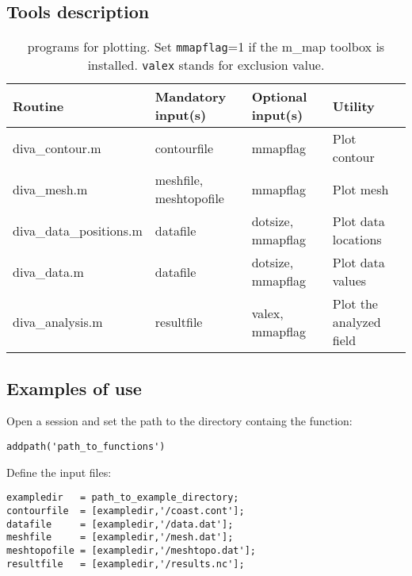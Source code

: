 \subsection{Tools description}
 
\begin{table}[htpb]
\centering
\caption[\matlab programs for plotting.]{\matlab programs for plotting. Set \texttt{mmapflag}=1 if the m\_map toolbox is installed. \texttt{valex} stands for exclusion value.}
\begin{tabular*}{\textwidth}{@{\extracolsep{\fill}}llll}
\toprule
Routine				&	Mandatory input(s) 		&	Optional input(s)	& 	Utility  			\\
\midrule
diva\_contour.m 		&	contourfile 			& mmapflag 			&	Plot contour		\\
diva\_mesh.m 			& meshfile, meshtopofile 	& mmapflag 			&	Plot mesh			\\
diva\_data\_positions.m	& datafile 					& dotsize, mmapflag & 	Plot data locations	\\
diva\_data.m 			& datafile 					& dotsize, mmapflag & Plot data values		\\
diva\_analysis.m 		& resultfile 				& valex, mmapflag 	 & Plot the analyzed field \\
\bottomrule
\end{tabular*}
\end{table}

\subsection{Examples of use}

Open a \matlab session and set the path to the directory containg the function:

\begin{lstlisting}[style=Matlab]
addpath('path_to_functions')
\end{lstlisting}

Define the input files:

\begin{lstlisting}[style=Matlab]
exampledir   = path_to_example_directory;
contourfile  = [exampledir,'/coast.cont'];
datafile     = [exampledir,'/data.dat'];
meshfile     = [exampledir,'/mesh.dat'];
meshtopofile = [exampledir,'/meshtopo.dat'];
resultfile   = [exampledir,'/results.nc'];
\end{lstlisting}


